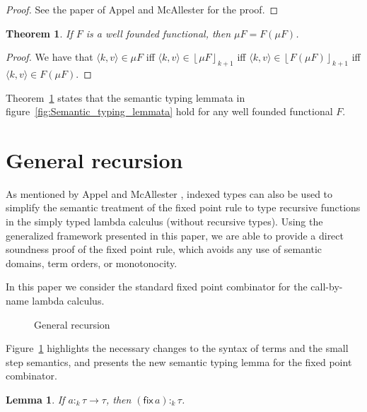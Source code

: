 \documentclass[12pt,a4paper,draft]{article}
\theoremstyle{definition}
\theoremstyle{plain}
\newtheorem{lemma}[definition]{Lemma}
\newtheorem{theorem}[definition]{Theorem}
\newcommand{\app}[2]{\ensuremath{{#1}\,{#2}}}
\newcommand{\fix}[1]{\ensuremath{\mathsf{fix}\,{#1}}}
\newcommand{\pair}[1]{\ensuremath{\langle{#1}\rangle}}
\newcommand{\floor}[1]{\ensuremath{\left\lfloor{#1}\right\rfloor}}
\begin{document}
\begin{proof}
  See the paper of Appel and McAllester \cite{Appel01} for the proof.
\end{proof}

\begin{theorem} \label{thm:Well_founded_fixpoint}
  If $F$ is a well founded functional, then $\mu F = F(\mu F)$.
\end{theorem}

\begin{proof}
  We have that $\pair{k,v} \in \mu F$ iff $\pair{k,v} \in \floor{\mu F}_{k+1}$
  iff $\pair{k,v} \in \floor{F \left(\mu F\right)}_{k+1}$ iff
  $\pair{k,v} \in F \left(\mu F\right)$.
\end{proof}

Theorem~\ref{thm:Well_founded_fixpoint} states that the semantic typing
lemmata in figure~\ref{fig:Semantic_typing_lemmata} hold for any well
founded functional $F$.


\section{General recursion}
\label{sec:General_recursion}

As mentioned by Appel and McAllester \cite{Appel01}, indexed types can also be used to simplify
the semantic treatment of the fixed point rule to type recursive functions in the
simply typed lambda calculus (without recursive types). Using the generalized framework
presented in this paper, we are able to provide a direct soundness proof of the fixed
point rule, which avoids any use of semantic domains, term orders, or monotonocity.

In this paper we consider the standard fixed point combinator for the call-by-name
lambda calculus.
\begin{figure}[htb]
  \centering
  \caption{General recursion}
  \label{fig:General_recursion}
\end{figure}
Figure~\ref{fig:General_recursion} highlights the necessary changes to the syntax of terms
and the small step semantics, and presents the new semantic typing lemma for the fixed point
combinator.

\begin{lemma}
  If $a :_k \tau \to \tau$, then $(\fix{a}) :_k \tau$.
\end{lemma}
\end{document}
